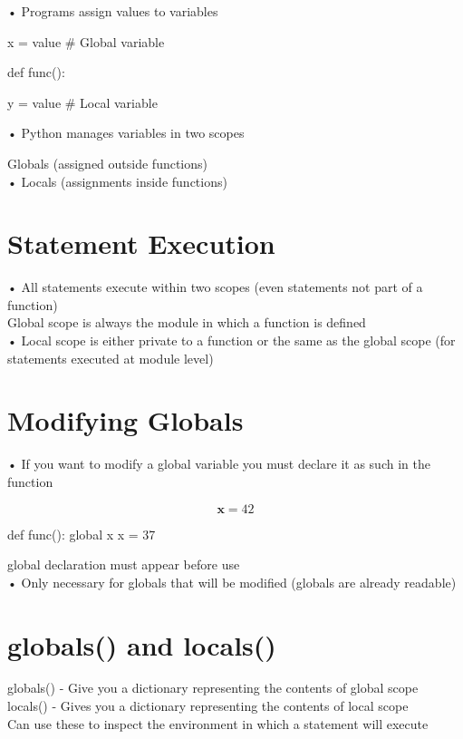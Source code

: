 \documentclass[
  letterpaper,
  DIV=11,
  numbers=noendperiod]{scrreprt}
\begin{document}
• Programs assign values to variables

x = value \# Global variable

def func():

y = value \# Local variable

• Python manages variables in two scopes

Globals (assigned outside functions)\\
• Locals (assignments inside functions)


\chapter{Statement Execution}\label{statement-execution}

• All statements execute within two scopes (even statements not part of
a function)\\
Global scope is always the module in which a function is defined\\
• Local scope is either private to a function or the same as the global
scope (for statements executed at module level)


\chapter{Modifying Globals}\label{modifying-globals}

• If you want to modify a global variable you must declare it as such in
the function

\[
\textbf {x} = 4 2
\]

def func(): global x x = 37

global declaration must appear before use\\
• Only necessary for globals that will be modified (globals are already
readable)


\chapter{globals() and locals()}\label{globals-and-locals}

globals() - Give you a dictionary representing the contents of global
scope\\
locals() - Gives you a dictionary representing the contents of local
scope\\
Can use these to inspect the environment in which a statement will
execute
\end{document}
